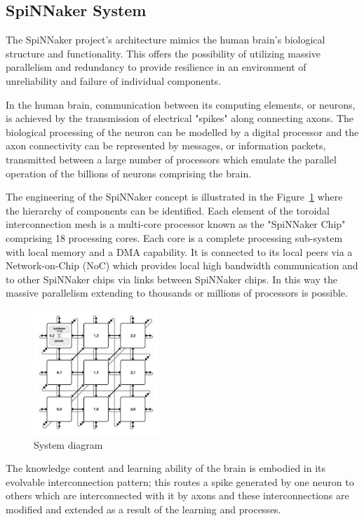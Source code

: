 \documentclass[journal]{journal}
\begin{document}
\subsection{SpiNNaker System}
The SpiNNaker project's architecture mimics the human brain's biological structure and functionality. 
This offers the possibility of utilizing massive parallelism and redundancy to provide resilience in an environment of unreliability and failure of individual components.

In the human brain, communication between its computing elements, or neurons, is achieved by the transmission of electrical "spikes" along connecting axons. 
The biological processing of the neuron can be modelled by a digital processor and the axon connectivity can be represented by messages, or information packets, transmitted between a large number of processors which emulate the parallel operation of the billions of neurons comprising the brain.

The engineering of the SpiNNaker concept is illustrated in the Figure~\ref{fig:sysdia} where the hierarchy of components can be identified. 
Each element of the toroidal interconnection mesh is a multi-core processor known as the "SpiNNaker Chip" comprising 18 processing cores. 
Each core is a complete processing sub-system with local memory and a DMA capability. 
It is connected to its local peers via a Network-on-Chip (NoC) which provides local high bandwidth communication and to other SpiNNaker chips via links between SpiNNaker chips. 
In this way the massive parallelism extending to thousands or millions of processors is possible.

\begin{figure}
\centering
	\includegraphics[width=0.42\textwidth]{pics/mesh_ctiff.jpg}
	\caption{System diagram}
	\label{fig:sysdia}
\end{figure}

The knowledge content and learning ability of the brain is embodied in its evolvable interconnection pattern; 
this routes a spike generated by one neuron to others which are interconnected with it by axons and these interconnections are modified and extended as a result of the learning and processes.
\end{document}
